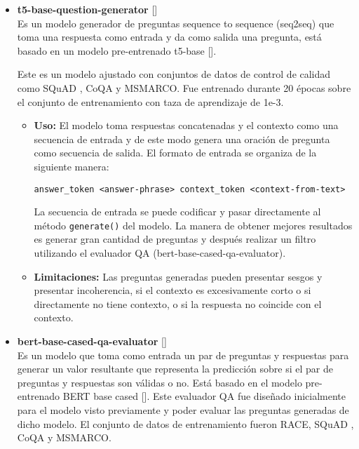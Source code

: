 \documentclass[../Main.tex]{subfiles}
\begin{document}
    \begin{itemize}
	\item \textbf{t5-base-question-generator }[] \\
	Es un modelo generador de preguntas sequence to sequence (seq2seq) que toma una respuesta como entrada y da como salida una pregunta, está basado en un modelo pre-entrenado t5-base []. %
	
	Este es un modelo ajustado con conjuntos de datos de control de calidad como SQuAD , CoQA y MSMARCO. Fue entrenado durante 20 épocas sobre el conjunto de entrenamiento con taza de aprendizaje de 1e-3.
	
	\begin{itemize}
	    \item \textbf{Uso:} El modelo toma respuestas concatenadas y el contexto como una secuencia de entrada y de este modo genera una oración de pregunta como secuencia de salida. El formato de entrada se organiza de la siguiente manera:
	    
    	    \begin{center}
    	        \texttt{answer\_token <answer-phrase> context\_token  <context-from-text>}
    	    \end{center}
    	    
    	    La secuencia de entrada se puede codificar y pasar directamente al método \texttt{generate()} del modelo. La manera de obtener mejores resultados es generar gran cantidad de preguntas y después realizar un filtro utilizando el evaluador QA (bert-base-cased-qa-evaluator).
	
	    \item \textbf{Limitaciones:} Las preguntas generadas pueden presentar sesgos y presentar incoherencia, si el contexto es excesivamente corto o si directamente no tiene contexto, o si la respuesta no coincide con el contexto.
	\end{itemize}
	
	
	
	\item \textbf{bert-base-cased-qa-evaluator }[] \\
	Es un modelo que toma como entrada un par de preguntas y respuestas para generar un valor resultante que representa la predicción sobre si el par de preguntas y respuestas son válidas o no. Está basado en el modelo pre-entrenado BERT base cased []. %
	Este evaluador QA fue diseñado inicialmente para el modelo visto previamente y poder evaluar las preguntas generadas de dicho modelo. El conjunto de datos de entrenamiento fueron RACE, SQuAD , CoQA y MSMARCO.


\end{itemize}
\end{document}
